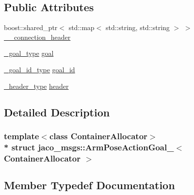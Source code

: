 \subsection*{Public Attributes}
\begin{DoxyCompactItemize}
\item 
boost\+::shared\+\_\+ptr$<$ std\+::map$<$ std\+::string, std\+::string $>$ $>$ \hyperlink{structjaco__msgs_1_1ArmPoseActionGoal___aee4d1c5a0ed60be0b6c3827941672d44}{\+\_\+\+\_\+connection\+\_\+header}
\item 
\hyperlink{structjaco__msgs_1_1ArmPoseActionGoal___af13ef7dee9d0b00a56d9fca8c439a3d0}{\+\_\+goal\+\_\+type} \hyperlink{structjaco__msgs_1_1ArmPoseActionGoal___ab45ae30e9322a91a845c852749425c97}{goal}
\item 
\hyperlink{structjaco__msgs_1_1ArmPoseActionGoal___a9135f1a63598eb8454905638ce80bff5}{\+\_\+goal\+\_\+id\+\_\+type} \hyperlink{structjaco__msgs_1_1ArmPoseActionGoal___a31706511987f26a7957034725c70f0d0}{goal\+\_\+id}
\item 
\hyperlink{structjaco__msgs_1_1ArmPoseActionGoal___aacdb1a8727f44b8684f1df0564c60ce6}{\+\_\+header\+\_\+type} \hyperlink{structjaco__msgs_1_1ArmPoseActionGoal___afb64a7a2cf0f0b1238fb648892309b73}{header}
\end{DoxyCompactItemize}


\subsection{Detailed Description}
\subsubsection*{template$<$class Container\+Allocator$>$\\*
struct jaco\+\_\+msgs\+::\+Arm\+Pose\+Action\+Goal\+\_\+$<$ Container\+Allocator $>$}



\subsection{Member Typedef Documentation}
